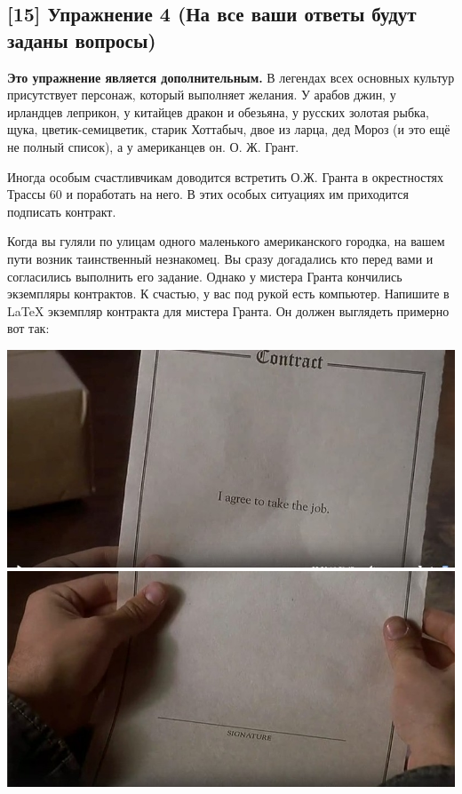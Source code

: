 \documentclass[12pt, a4paper, oneside]{article}
\begin{document}
\subsection*{[15]  Упражнение 4 (На все ваши ответы будут заданы вопросы)}

\textbf{Это упражнение  является дополнительным.}  В легендах всех основных культур присутствует персонаж, который выполняет желания. У арабов джин, у ирландцев леприкон, у китайцев дракон и обезьяна, у русских золотая рыбка, щука, цветик-семицветик, старик Хоттабыч, двое из ларца, дед Мороз (и это ещё не полный список), а у американцев он. О. Ж. Грант.

Иногда особым счастливчикам доводится встретить О.Ж. Гранта в окрестностях Трассы 60 и поработать на него. В этих особых ситуациях им приходится подписать контракт.

Когда вы гуляли по улицам одного маленького американского городка, на вашем пути возник таинственный незнакомец. Вы сразу догадались кто перед вами и согласились выполнить его задание. Однако у мистера Гранта кончились экземпляры контрактов. К счастью, у вас под рукой есть компьютер. Напишите в \LaTeX{} экземпляр контракта для мистера Гранта. Он должен выглядеть примерно вот так:

\begin{center}
	\includegraphics[scale=0.4]{Hg91uSv1cik.jpg}
	\includegraphics[scale=0.4]{t_XxgIqEmBE.jpg}
\end{center} 
\end{document}
